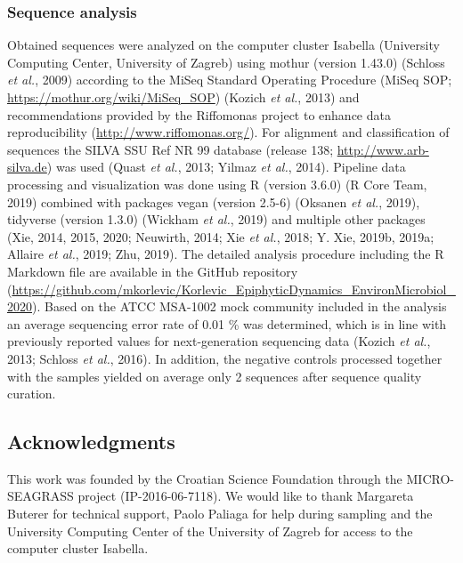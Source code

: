 \documentclass[12pt,]{article}
\begin{document}
\hypertarget{sequence-analysis}{%
\subsubsection{Sequence analysis}\label{sequence-analysis}}

Obtained sequences were analyzed on the computer cluster Isabella
(University Computing Center, University of Zagreb) using mothur
(version 1.43.0) (Schloss \emph{et al.}, 2009) according to the MiSeq
Standard Operating Procedure (MiSeq SOP;
\url{https://mothur.org/wiki/MiSeq_SOP}) (Kozich \emph{et al.}, 2013)
and recommendations provided by the Riffomonas project to enhance data
reproducibility (\url{http://www.riffomonas.org/}). For alignment and
classification of sequences the SILVA SSU Ref NR 99 database (release
138; \url{http://www.arb-silva.de}) was used (Quast \emph{et al.}, 2013;
Yilmaz \emph{et al.}, 2014). Pipeline data processing and visualization
was done using R (version 3.6.0) (R Core Team, 2019) combined with
packages vegan (version 2.5-6) (Oksanen \emph{et al.}, 2019), tidyverse
(version 1.3.0) (Wickham \emph{et al.}, 2019) and multiple other
packages (Xie, 2014, 2015, 2020; Neuwirth, 2014; Xie \emph{et al.},
2018; Y. Xie, 2019b, 2019a; Allaire \emph{et al.}, 2019; Zhu, 2019). The
detailed analysis procedure including the R Markdown file are available
in the GitHub repository
(\url{https://github.com/mkorlevic/Korlevic_EpiphyticDynamics_EnvironMicrobiol_2020}).
Based on the ATCC MSA-1002 mock community included in the analysis an
average sequencing error rate of 0.01 \si{\percent} was determined,
which is in line with previously reported values for next-generation
sequencing data (Kozich \emph{et al.}, 2013; Schloss \emph{et al.},
2016). In addition, the negative controls processed together with the
samples yielded on average only 2 sequences after sequence quality
curation.

\hypertarget{acknowledgments}{%
\subsection{Acknowledgments}\label{acknowledgments}}

This work was founded by the Croatian Science Foundation through the
MICRO-SEAGRASS project (IP-2016-06-7118). We would like to thank
Margareta Buterer for technical support, Paolo Paliaga for help during
sampling and the University Computing Center of the University of Zagreb
for access to the computer cluster Isabella.
\end{document}
